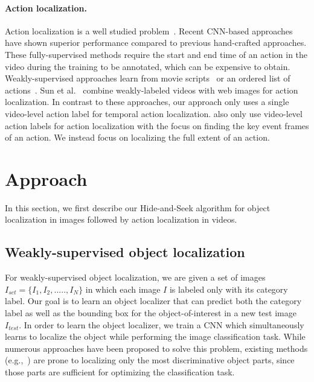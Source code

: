 \documentclass[10pt,twocolumn,letterpaper]{article}
\begin{document}
\vspace{-10pt}\paragraph{Action localization.}
Action localization is a well studied problem~\cite{laptev-cvpr2008,chen-cvpr2012,wang-iccv2013,jhuang-iccv2013,kantorov-cvpr2014}.  Recent CNN-based approaches~\cite{yeung-cvpr2016,Shou-CVPR2016} have shown superior performance compared to previous hand-crafted approaches. These fully-supervised methods require the start and end time of an action in the video during the training to be annotated, which can be expensive to obtain.  Weakly-supervised approaches learn from movie scripts~\cite{laptev-cvpr2008,duchenne-iccv2009} or an ordered list of actions~\cite{bojanowski-eccv2014,huang-eccv2016}.  Sun et al.~\cite{sun-mm2016} combine weakly-labeled videos with web images for action localization. In contrast to these approaches, our approach only uses a single video-level action label for temporal action localization. \cite{gan-cvpr2015} also only use video-level action labels for action localization with the focus on finding the key event frames of an action. We instead focus on localizing the full extent of an action.


\section{Approach}

In this section, we first describe our Hide-and-Seek algorithm for object localization in images followed by action localization in videos.

\subsection{Weakly-supervised object localization}

For weakly-supervised object localization, we are given a set of images $I_{set} = \{I_1, I_2,.....,I_N\}$ in which each image $I$ is labeled only with its category label.  Our goal is to learn an object localizer that can predict both the category label as well as the bounding box for the object-of-interest in a new test image $I_{test}$. In order to learn the object localizer, we train a CNN which simultaneously learns to localize the object while performing the image classification task.  While numerous approaches have been proposed to solve this problem, existing methods (e.g.,~\cite{song-icml2014,cinbis-arxiv2015,Oquab-cvpr15,zhou-cvpr2016}) are prone to localizing only the most discriminative object parts, since those parts are sufficient for optimizing the classification task.
\end{document}
